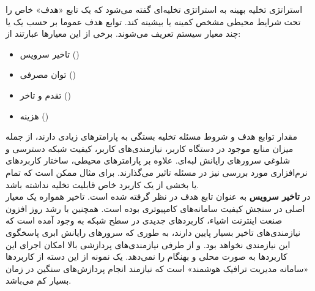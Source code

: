 استراتژی تخلیه بهینه به استراتژی تخلیه‌ای گفته می‌شود که یک تابع «هدف» خاص را تحت شرایط محیطی مشخص کمینه یا بیشینه کند. توابع هدف عموما بر حسب یک یا چند معیار سیستم تعریف می‌شوند. برخی از این معیارها عبارتند از:
\begin{itemize}
	\item تاخیر سرویس ()
	\item توان مصرفی ()
	\item تقدم و تاخر ()
	\item هزینه ()
\end{itemize}

مقدار توابع هدف و شروط مسئله تخلیه بستگی به پارامترهای زیادی دارند، از جمله میزان منابع موجود در دستگاه کاربر، نیازمندی‌های کاربر، کیفیت شبکه دسترسی و شلوغی سرورهای رایانش لبه‌ای. علاوه بر پارامترهای محیطی، ساختار کاربردهای نرم‌افزاری مورد بررسی نیز در مسئله تاثیر می‌گذارند. برای مثال ممکن است که تمام یا بخشی از یک کاربرد خاص قابلیت تخلیه نداشته باشد.  \\

در \CurrentProject \textbf{تاخیر سرویس} به عنوان تابع هدف در نظر گرفته شده است. تاخیر همواره یک معیار اصلی در سنجش کیفیت سامانه‌های کامپیوتری بوده است. همچنین با رشد روز افزون صنعت اینترنت اشیاء، کاربردهای جدیدی در سطح شبکه به وجود آمده است که نیازمندی‌های تاخیر بسیار پایین دارند، به طوری که سرورهای رایانش ابری پاسخگوی این نیازمندی نخواهد بود. و از طرفی نیازمندی‌های پردازشی بالا امکان اجرای این کاربردها به صورت محلی و بهنگام را نمی‌دهد. یک نمونه از این دسته از کاربردها «سامانه مدیریت ترافیک هوشمند» است که نیازمند انجام پردازش‌های سنگین در زمان بسیار کم می‌باشد. \\

